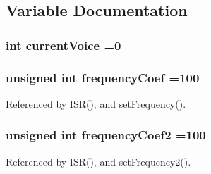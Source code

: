 \subsection{Variable Documentation}
\hypertarget{~main_8c_a7b2cf7f8cf113a3976b1ed3dd8dc0d80}{
\subsubsection[{current\-Voice}]{\setlength{\rightskip}{0pt plus 5cm}int current\-Voice =0}}\label{~main_8c_a7b2cf7f8cf113a3976b1ed3dd8dc0d80}
\hypertarget{~main_8c_aa5042ede4121ddfe2b77b83e965d3ce7}{
\subsubsection[{frequency\-Coef}]{\setlength{\rightskip}{0pt plus 5cm}unsigned int frequency\-Coef =100}}\label{~main_8c_aa5042ede4121ddfe2b77b83e965d3ce7}


Referenced by I\-S\-R(), and set\-Frequency().

\hypertarget{~main_8c_a1f5b04455abb645a315e61b460cece5d}{
\subsubsection[{frequency\-Coef2}]{\setlength{\rightskip}{0pt plus 5cm}unsigned int frequency\-Coef2 =100}}\label{~main_8c_a1f5b04455abb645a315e61b460cece5d}


Referenced by I\-S\-R(), and set\-Frequency2().

